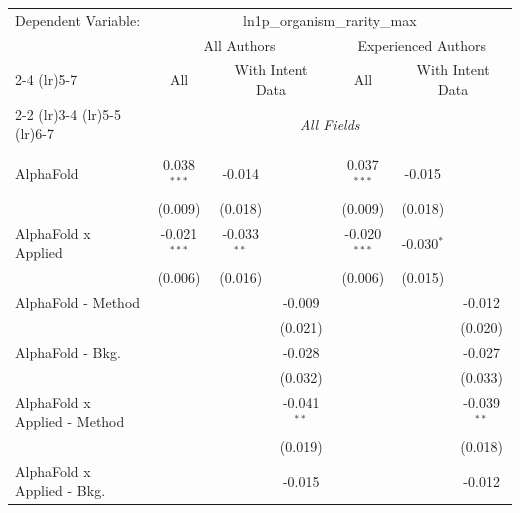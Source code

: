 \begingroup
\centering
\begin{tabular}{lcccccc}
   \tabularnewline \midrule \midrule
   Dependent Variable: & \multicolumn{6}{c}{ln1p\_organism\_rarity\_max}\\
 & \multicolumn{3}{c}{All Authors} & \multicolumn{3}{c}{Experienced Authors} \\
\cmidrule(lr){2-4} \cmidrule(lr){5-7}
 & \multicolumn{1}{c}{All} & \multicolumn{2}{c}{With Intent Data} & \multicolumn{1}{c}{All} & \multicolumn{2}{c}{With Intent Data} \\
\cmidrule(lr){2-2} \cmidrule(lr){3-4} \cmidrule(lr){5-5} \cmidrule(lr){6-7}
 & \multicolumn{6}{c}{\textit{All Fields}} \\ \\
   AlphaFold                      & 0.038$^{***}$  & -0.014        &               & 0.037$^{***}$  & -0.015        &   \\   
                                  & (0.009)        & (0.018)       &               & (0.009)        & (0.018)       &   \\   
   AlphaFold x Applied            & -0.021$^{***}$ & -0.033$^{**}$ &               & -0.020$^{***}$ & -0.030$^{*}$  &   \\   
                                  & (0.006)        & (0.016)       &               & (0.006)        & (0.015)       &   \\   
   AlphaFold - Method             &                &               & -0.009        &                &               & -0.012\\   
                                  &                &               & (0.021)       &                &               & (0.020)\\   
   AlphaFold - Bkg.               &                &               & -0.028        &                &               & -0.027\\   
                                  &                &               & (0.032)       &                &               & (0.033)\\   
   AlphaFold x Applied - Method   &                &               & -0.041$^{**}$ &                &               & -0.039$^{**}$\\   
                                  &                &               & (0.019)       &                &               & (0.018)\\   
   AlphaFold x Applied - Bkg.     &                &               & -0.015        &                &               & -0.012\\   

\end{tabular}
